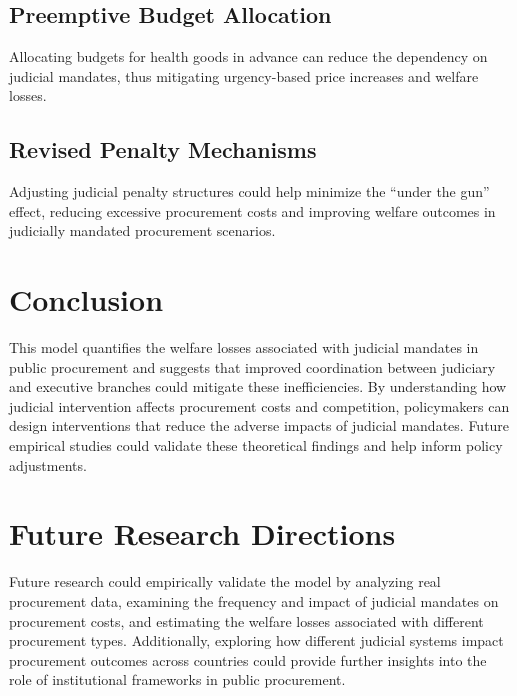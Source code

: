 \documentclass[12pt]{article}
\begin{document}
\subsection{Preemptive Budget Allocation}
Allocating budgets for health goods in advance can reduce the dependency on judicial mandates, thus mitigating urgency-based price increases and welfare losses.

\subsection{Revised Penalty Mechanisms}
Adjusting judicial penalty structures could help minimize the “under the gun” effect, reducing excessive procurement costs and improving welfare outcomes in judicially mandated procurement scenarios.

\section{Conclusion}
This model quantifies the welfare losses associated with judicial mandates in public procurement and suggests that improved coordination between judiciary and executive branches could mitigate these inefficiencies. By understanding how judicial intervention affects procurement costs and competition, policymakers can design interventions that reduce the adverse impacts of judicial mandates. Future empirical studies could validate these theoretical findings and help inform policy adjustments.

\section{Future Research Directions}
Future research could empirically validate the model by analyzing real procurement data, examining the frequency and impact of judicial mandates on procurement costs, and estimating the welfare losses associated with different procurement types. Additionally, exploring how different judicial systems impact procurement outcomes across countries could provide further insights into the role of institutional frameworks in public procurement.



\end{document}
